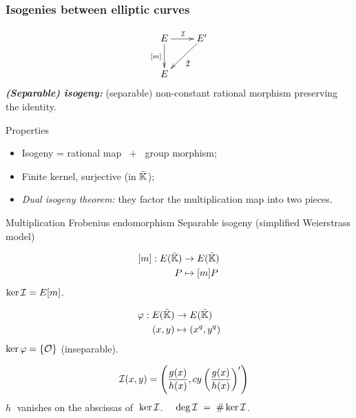 \documentclass[10pt,usepdftitle=false]{beamer}
\begin{document}

\begin{frame}
  \frametitle{Isogenies between elliptic curves}
  
  \vspace{-5mm}

  {\large \[\xymatrix{E\ar[d]_{[m]}\ar[r]^{\I} & E'\ar[dl]^{\hat{\I}}\\E}\]} 
  \emph{\textbf{(Separable) isogeny:}} (separable)
  non-constant rational morphism preserving the identity.
  
  \begin{block}{Properties}
    \begin{itemize}
    \item Isogeny = rational map $\;+\;$ group morphism;
    \item Finite kernel, surjective (in $\bar{\mathbb{K}}$);
    \item \emph{Dual isogeny theorem:} they factor the multiplication map into two pieces.
    \end{itemize}
  \end{block}

  \vspace{-1mm}

  \begin{block}{
	\begin{overprint}
	 Multiplication	
	\onslide<2> Frobenius endomorphism
	\onslide<3> Separable isogeny (simplified Weierstrass model)
	\end{overprint}
      }
    \begin{overprint}
      \[\begin{aligned}
	{}[m] : E(\bar{\mathbb{K}}) &\rightarrow E(\bar{\mathbb{K}})\\
	                   P &\mapsto [m]P
      \end{aligned}\]
      $\ker\mathcal{I} = E[m]$.

      \[\begin{aligned}
	\varphi : E(\bar{\mathbb{K}}) &\rightarrow E(\bar{\mathbb{K}})\\
	               (x,y) &\mapsto (x^q,y^q)
      \end{aligned}\]
      $\ker\varphi = \{\mathcal{O}\}$ (inseparable).

      \[\quad\mathcal{I}(x,y) = \left(\frac{g(x)}{h(x)},
      cy\left(\frac{g(x)}{h(x)}\right)'\right)\]
      $h\;$ vanishes on the abscissas of $\;\ker\mathcal{I}$. \emph{$\quad\deg\mathcal{I} \;=\; \# \ker\mathcal{I}$}.
    \end{overprint}
  \end{block}  
\end{frame}
\end{document}
